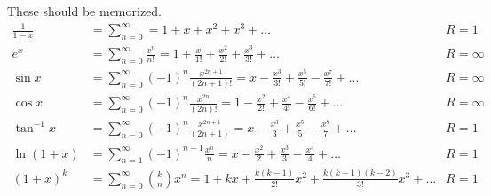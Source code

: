 \documentclass[12pt]{article}
\begin{document}
These should be memorized.
\begin{align*}
    \frac{1}{1-x} &= \sum_{n=0}^{\infty}=1+x+x^2+x^3+\dots & R = 1\\
    e^x &= \sum_{n=0}^{\infty} \frac{x^n}{n!} = 1 + \frac{x}{1!} + \frac{x^2}{2!} + \frac{x^3}{3!} + \dots & R = \infty\\
    \sin x &= \sum_{n=0}^{\infty} (-1)^n \frac{x^{2n+1}}{(2n+1)!} = x - \frac{x^3}{3!} + \frac{x^5}{5!} - \frac{x^7}{7!} + \dots & R = \infty\\
    \cos x &= \sum_{n=0}^{\infty} (-1)^n \frac{x^{2n}}{(2n)!} = 1 - \frac{x^2}{2!} + \frac{x^4}{4!} - \frac{x^6}{6!} + \dots & R = \infty\\
    \tan^{-1} x &= \sum_{n=0}^{\infty} (-1)^n \frac{x^{2n+1}}{(2n+1)} = x - \frac{x^3}{3} + \frac{x^5}{5} - \frac{x^7}{7} + \dots & R = 1\\
    \ln(1+x) &= \sum_{n=1}^{\infty} (-1)^{n-1} \frac{x^n}{n} = x - \frac{x^2}{2} + \frac{x^3}{3} - \frac{x^4}{4} + \dots & R = 1\\
    (1+x)^k &= \sum_{n=0}^{\infty} {{k}\choose{n}} x^n = 1 + kx + \frac{k(k-1)}{2!}x^2 + \frac{k(k-1)(k-2)}{3!}x^3 + \dots & R = 1
\end{align*}
\end{document}

